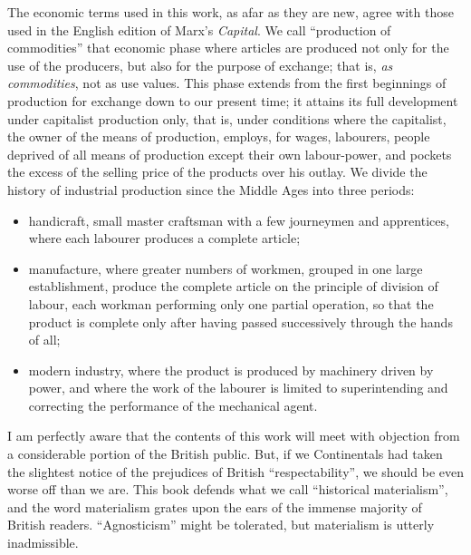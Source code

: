 The economic terms used in this work, as afar as they are new, agree with
those used in the English edition of Marx's \emph{Capital}. We call ``production
of commodities'' that economic phase where articles are produced not only for
the use of the producers, but also for the purpose of exchange; that is,
\emph{as commodities}, not as use values. This phase extends from the first
beginnings of production for exchange down to our present time; it attains its
full development under capitalist production only, that is, under conditions
where the capitalist, the owner of the means of production, employs, for wages,
labourers, people deprived of all means of production except their own
labour-power, and pockets the excess of the selling price of the products over
his outlay. We divide the history of industrial production since the Middle
Ages into three periods:
%
\begin{itemize}
  \item{
    handicraft, small master craftsman with a few journeymen and apprentices,
    where each labourer produces a complete article;
  }
  \item{
    manufacture, where greater numbers of workmen, grouped in one large
    establishment, produce the complete article on the principle of division of
    labour, each workman performing only one partial operation, so that the
    product is complete only after having passed successively through the hands
    of all;
  }
  \item{
    modern industry, where the product is produced by machinery driven by power,
    and where the work of the labourer is limited to superintending and
    correcting the performance of the mechanical agent.
  }
\end{itemize}
%
I am perfectly aware that the contents of this work will meet with objection
from a considerable portion of the British public. But, if we Continentals had
taken the slightest notice of the prejudices of British ``respectability'', we
should be even worse off than we are. This book defends what we call
``historical materialism'', and the word materialism grates upon the ears of the
immense majority of British readers. ``Agnosticism'' might be tolerated, but
materialism is utterly inadmissible.


